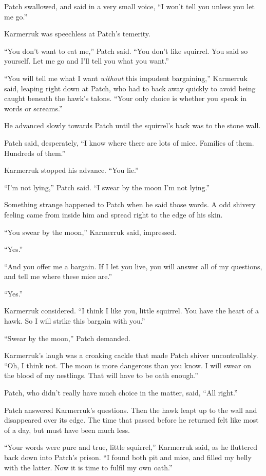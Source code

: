 \documentclass[ebook,oneside,openany,17pt]{memoir}
\begin{document}
Patch swallowed, and said in a very small voice, “I won’t tell you
unless you let me go.”

Karmerruk was speechless at Patch’s temerity.

“You don’t want to eat me,” Patch said. “You don’t like squirrel. You
said so yourself. Let me go and I’ll tell you what you want.”

“You will tell me what I want \emph{without} this impudent
bargaining,” Karmerruk said, leaping right down at Patch, who had to
back away quickly to avoid being caught beneath the hawk’s
talons. “Your only choice is whether you speak in words or screams.”

He advanced slowly towards Patch until the squirrel’s back was to the
stone wall.

Patch said, desperately, “I know where there are lots of
mice. Families of them. Hundreds of them.”

Karmerruk stopped his advance. “You lie.”

“I’m not lying,” Patch said. “I swear by the moon I’m not lying.”

Something strange happened to Patch when he said those words. A odd
shivery feeling came from inside him and spread right to the edge of
his skin.

“You swear by the moon,” Karmerruk said, impressed.

“Yes.”

“And you offer me a bargain. If I let you live, you will answer all of
my questions, and tell me where these mice are.”

“Yes.”

Karmerruk considered. “I think I like you, little squirrel. You have
the heart of a hawk. So I will strike this bargain with you.”

“Swear by the moon,” Patch demanded.

Karmerruk’s laugh was a croaking cackle that made Patch shiver
uncontrollably. “Oh, I think not. The moon is more dangerous than you
know. I will swear on the blood of my nestlings. That will have to be
oath enough.”

Patch, who didn’t really have much choice in the matter, said, “All
right.”

Patch answered Karmerruk’s questions. Then the hawk leapt up to the
wall and disappeared over its edge. The time that passed before he
returned felt like most of a day, but must have been much less.

“Your words were pure and true, little squirrel,” Karmerruk said, as
he fluttered back down into Patch’s prison. “I found both pit and
mice, and filled my belly with the latter. Now it is time to fulfil my
own oath.”
\end{document}
